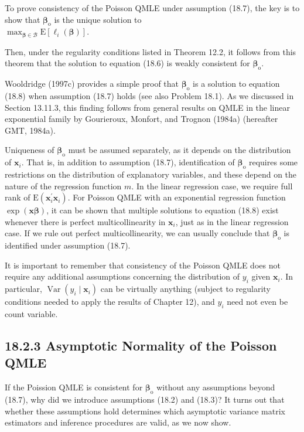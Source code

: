 \documentclass[10pt]{article}
\begin{document}
To prove consistency of the Poisson QMLE under assumption (18.7), the key is to show that $\boldsymbol{\beta}_{\mathrm{o}}$ is the unique solution to\\
$\max _{\boldsymbol{\beta} \in \mathscr{B}} \mathrm{E}\left[\ell_{i}(\boldsymbol{\beta})\right]$.

Then, under the regularity conditions listed in Theorem 12.2, it follows from this theorem that the solution to equation (18.6) is weakly consistent for $\boldsymbol{\beta}_{\mathrm{o}}$.

Wooldridge (1997c) provides a simple proof that $\boldsymbol{\beta}_{\mathrm{o}}$ is a solution to equation (18.8) when assumption (18.7) holds (see also Problem 18.1). As we discussed in Section 13.11.3, this finding follows from general results on QMLE in the linear exponential family by Gourieroux, Monfort, and Trognon (1984a) (hereafter GMT, 1984a).

Uniqueness of $\boldsymbol{\beta}_{\mathrm{o}}$ must be assumed separately, as it depends on the distribution of $\mathbf{x}_{i}$. That is, in addition to assumption (18.7), identification of $\boldsymbol{\beta}_{\mathrm{o}}$ requires some restrictions on the distribution of explanatory variables, and these depend on the nature of the regression function $m$. In the linear regression case, we require full rank of $\mathrm{E}\left(\mathbf{x}_{i}^{\prime} \mathbf{x}_{i}\right)$. For Poisson QMLE with an exponential regression function $\exp (\mathbf{x} \boldsymbol{\beta})$, it can be shown that multiple solutions to equation (18.8) exist whenever there is perfect multicollinearity in $\mathbf{x}_{i}$, just as in the linear regression case. If we rule out perfect multicollinearity, we can usually conclude that $\boldsymbol{\beta}_{\mathrm{o}}$ is identified under assumption (18.7).

It is important to remember that consistency of the Poisson QMLE does not require any additional assumptions concerning the distribution of $y_{i}$ given $\mathbf{x}_{i}$. In particular, $\operatorname{Var}\left(y_{i} \mid \mathbf{x}_{i}\right)$ can be virtually anything (subject to regularity conditions needed to apply the results of Chapter 12), and $y_{i}$ need not even be count variable.

\subsection*{18.2.3 Asymptotic Normality of the Poisson QMLE}
If the Poission QMLE is consistent for $\boldsymbol{\beta}_{\mathrm{o}}$ without any assumptions beyond (18.7), why did we introduce assumptions (18.2) and (18.3)? It turns out that whether these assumptions hold determines which asymptotic variance matrix estimators and inference procedures are valid, as we now show.
\end{document}
